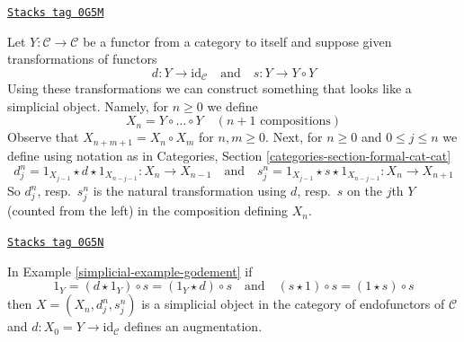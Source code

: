 \begin{example}[Godement]
\label{simplicial-example-godement}
\href{https://stacks.math.columbia.edu/tag/0G5M}{\texttt{Stacks tag 0G5M}}

Let $Y : \mathcal{C} \to \mathcal{C}$ be a functor from a category to
itself and suppose given transformations of functors
$$
d : Y \longrightarrow \text{id}_\mathcal{C}
\quad\text{and}\quad
s : Y \longrightarrow Y \circ Y
$$
Using these transformations we can construct something that looks
like a simplicial object. Namely, for $n \geq 0$ we define
$$
X_n = Y \circ \ldots \circ Y \quad (n + 1\text{ compositions})
$$
Observe that $X_{n + m + 1} = X_n \circ X_m$ for $n, m \geq 0$.
Next, for $n \geq 0$ and $0 \leq j \leq n$ we define using notation
as in Categories, Section \ref{categories-section-formal-cat-cat}
$$
d^n_j = 1_{X_{j - 1}} \star d \star 1_{X_{n - j - 1}} :
X_n
\to
X_{n - 1}
\quad\text{and}\quad
s^n_j = 1_{X_{j - 1}} \star s \star 1_{X_{n - j - 1}} :
X_n
\to
X_{n + 1}
$$
So $d^n_j$, resp.\ $s^n_j$ is the natural transformation using
$d$, resp.\ $s$ on the $j$th $Y$ (counted from the left) in the
composition defining $X_n$.
\end{example}

\begin{lemma}[Godement]
\label{simplicial-lemma-godement}
\href{https://stacks.math.columbia.edu/tag/0G5N}{\texttt{Stacks tag 0G5N}}

In Example \ref{simplicial-example-godement} if
$$
1_Y = (d \star 1_Y) \circ s = (1_Y \star d) \circ s
\quad\text{and}\quad
(s \star 1) \circ s = (1 \star s) \circ s
$$
then $X = (X_n, d^n_j, s^n_j)$ is a simplicial object in the category
of endofunctors of $\mathcal{C}$ and $d : X_0 = Y \to \text{id}_\mathcal{C}$
defines an augmentation.
\end{lemma}

